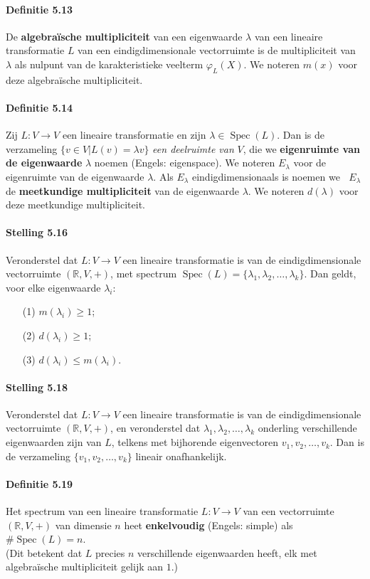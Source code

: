 \documentclass[11pt,oneside,a4paper]{article}
\DeclareMathOperator{\rdim}{dim_\mathbb{R}}
\DeclareMathOperator{\Spec}{Spec}
\begin{document}
	\paragraph{Definitie 5.13}
		De \textbf{algebraïsche multipliciteit} van een eigenwaarde $\lambda$ van een lineaire transformatie $L$ van een eindigdimensionale vectorruimte is de multipliciteit van $\lambda$ als nulpunt van de karakteristieke veelterm $\varphi_L(X)$. We noteren $m(x)$ voor deze algebraïsche multipliciteit.
	\paragraph{Definitie 5.14}
		Zij $L: V \to V$ een lineaire transformatie en zijn $\lambda \in \Spec(L)$. Dan is de verzameling $\{v\in V|L(v)=\lambda v\}$ \textit{een deelruimte van} $V$, die we \textbf{eigenruimte van de eigenwaarde} $\lambda$ noemen (Engels: eigenspace). We noteren $E_\lambda$ voor de eigenruimte van de eigenwaarde $\lambda$. Als $E_\lambda$ eindigdimensionaals is noemen we $\rdim E_\lambda$ de \textbf{meetkundige multipliciteit} van de eigenwaarde $\lambda$. We noteren $d(\lambda)$ voor deze meetkundige multipliciteit.
	\paragraph{Stelling 5.16}
		Veronderstel dat $L: V \to V$ een lineaire transformatie is van de eindigdimensionale vectorruimte $(\mathbb{R}, V,+)$, met spectrum $\Spec(L) = \{\lambda_1,\lambda_2,\ldots, \lambda_k\}$. Dan geldt, voor elke eigenwaarde $\lambda_i$:
		\begin{itemize}
			\item[(1)] $m(\lambda_i) \ge 1$; 
			\item[(2)] $d(\lambda_i) \ge 1$;
			\item[(3)] $d(\lambda_i) \le m(\lambda_i)$.
		\end{itemize}
	\paragraph{Stelling 5.18}	
		Veronderstel dat $L: V \to V$ een lineaire transformatie is van de eindigdimensionale vectorruimte $(\mathbb{R}, V, +)$, en veronderstel dat $\lambda_1,\lambda_2,\ldots, \lambda_k$ onderling verschillende eigenwaarden zijn van $L$, telkens met bijhorende eigenvectoren $v_1,v_2,\ldots ,v_k$. Dan is de verzameling $\{v_1,v_2,\ldots ,v_k\}$ lineair onafhankelijk.
	\paragraph{Definitie 5.19}
		Het spectrum van een lineaire transformatie $L: V \to V$ van een vectorruimte $(\mathbb{R}, V,+)$ van dimensie $n$ heet \textbf{enkelvoudig} (Engels: simple) als $\# \Spec(L)=n$. \\ (Dit betekent dat $L$ precies $n$ verschillende eigenwaarden heeft, elk met algebraïsche multipliciteit gelijk aan $1$.)
\end{document}
